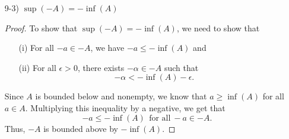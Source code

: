 \documentclass[11pt,a4paper]{article}
\begin{document}
\begin{enumerate}
\begin{enumerate}
            \begin{proof}
            In order to show that \( \sup(A+B) = \sup(A) + \sup(B) \), we need to show that   
            \begin{enumerate}
                \item[(i)] \( A + B  \) is bounded above and
                \item[(ii)] For every \( \epsilon > 0 \) ,there exists a \( \lambda > \sup(A) + \sup(B) - \epsilon \).
            \end{enumerate}
            Note that \( A + B \neq \emptyset  \) since \( A  \) and \( B  \) is nonempty.Since \( A  \) and \( B  \) are bounded above, we have that \( a \leq \sup (A)  \) for all \( a \in A   \) and \(  b \leq \sup (B) \) for all \( b \in B  \) implies that 
            \[  a + b \leq \sup(A) + \sup(B)  \]
            for all \( a + b \in A + B  \), which proves (i).
            Let \( \epsilon > 0  \). Since \( \sup(A) \) and \( \sup(B) \) exists, we see that there exists \( \alpha \in A  \) and \( \beta \in B  \) such that 
        \[  \alpha > \sup(A) - \frac{ \epsilon }{ 2 }   \]
        and 
        \[  \beta > \sup(B) - \frac{ \epsilon  }{ 2 }  \]
        by the lemma found in {\hyperref[Problem 2]{Problem 2}}. Adding these two inequalities results in 
        \[ \lambda =  \alpha + \beta > \sup(A) + \sup(B) - \epsilon. \]
        Thus, \( \sup(A+B) = \sup(A) + \sup(B) \) by the lemma found in {\hyperref[Problem 2]{Problem 2}}.
            \end{proof}
        \item[9-3)] \( \sup(-A) = - \inf(A) \) 
            \begin{proof}
            To show that \( \sup(-A) = - \inf(A) \), we need to show that  
            \begin{enumerate}
                \item[(i)] For all \( - a \in -A  \), we have \( -a \leq - \inf(A)  \) and
                \item[(ii)] For all \( \epsilon > 0  \), there exists \( - \alpha \in -A  \) such that 
                    \[  - \alpha < - \inf(A) - \epsilon. \]
            \end{enumerate}
            Since \( A  \) is bounded below and nonempty, we know that \( a \geq \inf(A) \) for all \( a \in A  \). Multiplying this inequality by a negative, we get that
            \[  - a \leq - \inf(A) \ \ \text{for all} \ -a \in - A. \]
            Thus, \( -A  \) is bounded above by \( - \inf(A) \).


\end{proof}
\end{enumerate}
\end{enumerate}
\end{document}
